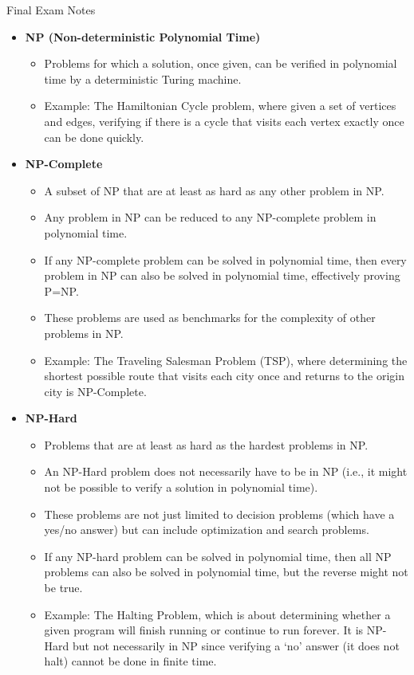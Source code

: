 \begin{examnotes}{Final Exam Notes}
    \begin{itemize}
        \item \textbf{NP (Non-deterministic Polynomial Time)}
        \begin{itemize}
            \item Problems for which a solution, once given, can be verified in polynomial time by a deterministic Turing machine.
            \item Example: The Hamiltonian Cycle problem, where given a set of vertices and edges, verifying if there is a cycle that visits each vertex exactly once can be done quickly.
        \end{itemize}
        \item \textbf{NP-Complete}
        \begin{itemize}
            \item A subset of NP that are at least as hard as any other problem in NP.
            \item Any problem in NP can be reduced to any NP-complete problem in polynomial time.
            \item If any NP-complete problem can be solved in polynomial time, then every problem in NP can also be solved in polynomial time, effectively proving P=NP.
            \item These problems are used as benchmarks for the complexity of other problems in NP.
            \item Example: The Traveling Salesman Problem (TSP), where determining the shortest possible route that visits each city once and returns to the origin city is NP-Complete.
        \end{itemize}
        \item \textbf{NP-Hard}
        \begin{itemize}
            \item Problems that are at least as hard as the hardest problems in NP.
            \item An NP-Hard problem does not necessarily have to be in NP (i.e., it might not be possible to verify a solution in polynomial time).
            \item These problems are not just limited to decision problems (which have a yes/no answer) but can include optimization and search problems.
            \item If any NP-hard problem can be solved in polynomial time, then all NP problems can also be solved in polynomial time, but the reverse might not be true.
            \item Example: The Halting Problem, which is about determining whether a given program will finish running or continue to run forever. It is NP-Hard but not necessarily in NP since 
            verifying a `no' answer (it does not halt) cannot be done in finite time.
        \end{itemize}
    \end{itemize}


\end{examnotes}
